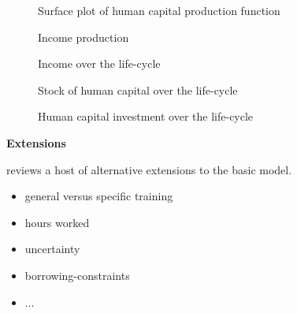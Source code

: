 \begin{frame}\begin{figure}[htp]\centering
\caption{Surface plot of human capital production function} 
\end{figure}\end{frame}

\begin{frame}\begin{figure}[htp]\centering
\caption{Income production}\label{Income production}
\end{figure}\end{frame}

\begin{frame}\begin{figure}[htp]\centering
\caption{Income over the life-cycle}\label{Income over the life-cycle}
\end{figure}\end{frame}

\begin{frame}\begin{figure}[htp]\centering
\caption{Stock of human capital over the life-cycle}
\label{Stock of human capital over the life-cycle}
\end{figure}\end{frame}

\begin{frame}\begin{figure}[htp]\centering
\caption{Human capital investment over the life-cycle}
\label{Human capital investment over the life-cycle}
\end{figure}\end{frame}
\begin{frame}\textbf{Extensions}\vspace{0.3cm}

 reviews a host of alternative extensions to the basic model.\\

\begin{itemize}\setlength\itemsep{1em}
\item general versus specific training
\item hours worked
\item uncertainty
\item borrowing-constraints
\item $\hdots$
\end{itemize}

\end{frame}
